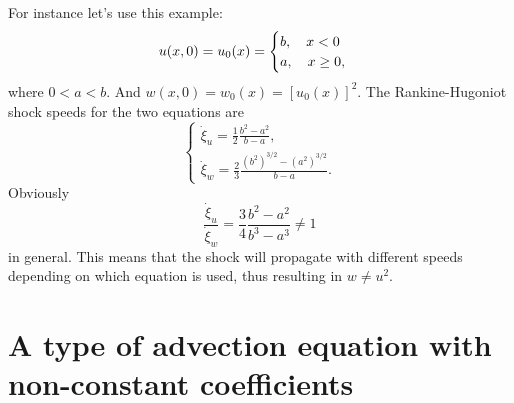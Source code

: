 \documentclass[11pt,letter, swedish, english
]{article}
\begin{document}
For instance let's use this example:
\begin{equation}
u(x, 0) = u_0(x) =
\begin{cases}
b\qcomma x<0\\
a\qcomma x\ge0,
\end{cases}
\end{equation}
where $0<a<b$. And $w(x, 0) = w_0(x) = [u_0(x)]^2$. The
Rankine-Hugoniot shock speeds for the two equations are
\begin{equation}
\begin{cases}
\dot\xi_u = \frac{1}{2}\frac{b^2-a^2}{b-a},\\
\dot\xi_w = \frac{2}{3}\frac{(b^2)^{3/2}-(a^2)^{3/2}}{b-a}.
\end{cases}
\end{equation}
Obviously
\begin{equation}
\frac{\dot\xi_u}{\dot\xi_w}=\frac{3}{4}\frac{b^2-a^2}{b^{3}-a^{3}} 
\neq1
\end{equation}
in general. 
This means that the shock will propagate with different speeds
depending on which equation is used, thus resulting in $w\neq u^2$.
 

\section{A type of advection equation with non-constant coefficients}
\end{document}
